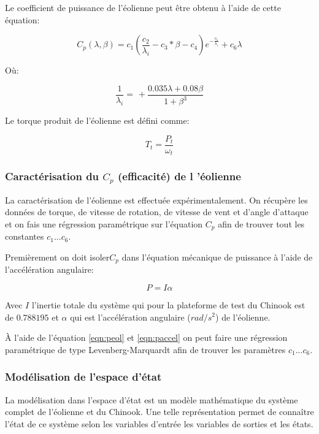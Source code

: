 Le coefficient de puissance de l'éolienne peut être obtenu à l'aide de cette équation:

\begin{equation}
C_p(\lambda,\beta) = c_1 (\frac{c_2}{\lambda_i}-c_3*\beta - c_4) e^{-\frac{c_5}{\lambda_i}} + c_6 \lambda
\end{equation}

Où:

\begin{equation}
\frac{1}{\lambda_i} = \frac{}{} + \frac{0.035\lambda+0.08\beta}{1+\beta^3} 
\end{equation}


Le torque produit de l'éolienne est défini comme:

\begin{equation}
T_t = \frac{P_t}{\omega_t}
\end{equation}

\subsubsection{Caractérisation du $C_p$ (efficacité) de l 'éolienne}

La caractérisation de l'éolienne est effectuée expérimentalement. On récupère les données de torque, de vitesse de rotation, de vitesse de vent et d'angle d'attaque et on fais une régression paramétrique sur l'équation $C_p$ afin de trouver tout les constantes $c_1 ... c_6$.

Premièrement on doit isoler$C_p$ dans l'équation mécanique de puissance à l'aide de l'accélération angulaire:

\begin{equation}
  \label{eqn:paccel}
  P= I \alpha
\end{equation}

Avec $I$ l'inertie totale du système qui pour la plateforme de test du Chinook est de $0.788195$
et $\alpha$ qui est l'accélération angulaire ($rad/s^2$) de l'éolienne.

À l'aide de l'équation \ref{eqn:peol} et \ref{eqn:paccel} on peut faire une régression paramétrique de type Levenberg-Marquardt afin de trouver les paramètres  $c_1 ... c_6$.

\subsubsection{Modélisation de l'espace d'état}

La modélisation dans l'espace d'état \citep{wiki_statespace} est un modèle mathématique du système complet de l'éolienne et du Chinook. Une telle représentation permet de connaître l'état de ce système selon les variables d'entrée les variables de sorties et les états.

